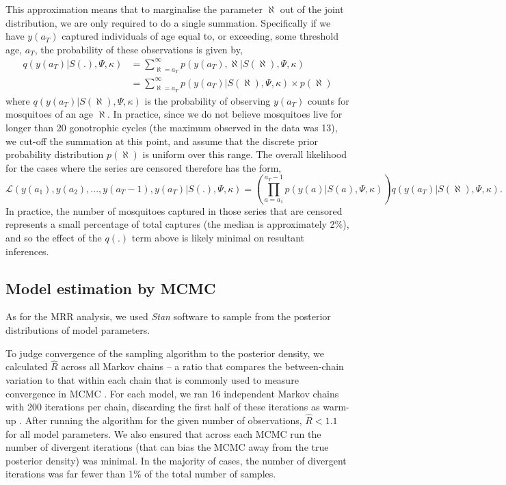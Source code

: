 \documentclass[12pt]{article}
\begin{document}
{This approximation means that to marginalise the parameter $\aleph$ out of the joint distribution, we are only required to do a single summation. Specifically if we have $y(a_T)$ captured individuals of age equal to, or exceeding, some threshold age, $a_T$, the probability of these observations is given by,
%
\begin{align}
q(y(a_T)|S(.),\Psi,\kappa) &= \sum_{\aleph=a_T}^{\infty} p(y(a_T),\aleph|S(\aleph),\Psi,\kappa)\\
&= \sum_{\aleph=a_T}^{\infty} p(y(a_T)|S(\aleph),\Psi,\kappa) \times p(\aleph)
\end{align}
%
where $q(y(a_T)|S(\aleph),\Psi,\kappa)$ is the probability of observing $y(a_T)$ counts for mosquitoes of an age $\aleph$. In practice, since we do not believe mosquitoes live for longer than 20 gonotrophic cycles (the maximum observed in the data was 13), we cut-off the summation at this point, and assume that the discrete prior probability distribution $p(\aleph)$ is uniform over this range. The overall likelihood for the cases where the series are censored therefore has the form,
%
\begin{equation}
\mathcal{L}(y(a_1),y(a_2),...,y(a_T-1),y(a_T)|S(.),\Psi,\kappa) = \left(\prod\limits_{a=a_1}^{a_T-1} p(y(a)|S(a),\Psi,\kappa)\right) q(y(a_T)|S(\aleph),\Psi,\kappa).
\end{equation}
%
In practice, the number of mosquitoes captured in those series that are censored represents a small percentage of total captures (the median is approximately 2\%), and so the effect of the $q(.)$ term above is likely minimal on resultant inferences.

\subsection{Model estimation by MCMC}\label{sec:dissection_MCMC}
As for the MRR analysis, we used \textit{Stan} software \citep{carpenter2016stan} to sample from the posterior distributions of model parameters.

To judge convergence of the sampling algorithm to the posterior density, we calculated $\hat{R}$ across all Markov chains -- a ratio that compares the between-chain variation to that within each chain that is commonly used to measure convergence in MCMC \citep{gelman1992inference}. For each model, we ran 16 independent Markov chains with 200 iterations per chain, discarding the first half of these iterations as warm-up \citep{gelman2014bayesian}. After running the algorithm for the given number of observations, $\hat{R}<1.1$ for all model parameters. We also ensured that across each MCMC run the number of divergent iterations (that can bias the MCMC away from the true posterior density) was minimal. In the majority of cases, the number of divergent iterations was far fewer than 1\% of the total number of samples.

}
\end{document}
